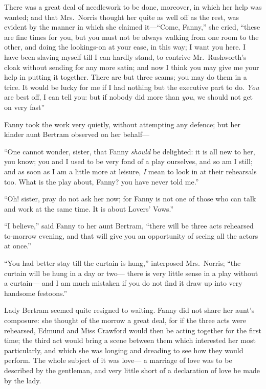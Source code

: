 There was a great deal of needlework to be done, moreover,
in which her help was wanted; and that Mrs.\ Norris
thought her quite as well off as the rest, was evident
by the manner in which she claimed it---``Come, Fanny,''
she cried, ``these are fine times for you, but you must
not be always walking from one room to the other,
and doing the lookings-on at your ease, in this way;
I want you here.  I have been slaving myself till I
can hardly stand, to contrive Mr.\ Rushworth's cloak
without sending for any more satin; and now I think
you may give me your help in putting it together.
There are but three seams; you may do them in a trice.
It would be lucky for me if I had nothing but the executive
part to do.  \emph{You} are best off, I can tell you:
but if nobody did more than \emph{you}, we should not get on
very fast''

Fanny took the work very quietly, without attempting
any defence; but her kinder aunt Bertram observed on her behalf---%

``One cannot wonder, sister, that Fanny \emph{should} be delighted:
it is all new to her, you know; you and I used to be
very fond of a play ourselves, and so am I still;
and as soon as I am a little more at leisure, \emph{I} mean
to look in at their rehearsals too.  What is the play about,
Fanny? you have never told me.''

``Oh! sister, pray do not ask her now; for Fanny is not
one of those who can talk and work at the same time.
It is about Lovers' Vows.''

``I believe,'' said Fanny to her aunt Bertram, ``there will
be three acts rehearsed to-morrow evening, and that will
give you an opportunity of seeing all the actors at once.''

``You had better stay till the curtain is hung,'' interposed
Mrs.\ Norris; ``the curtain will be hung in a day or two---%
there is very little sense in a play without a curtain---%
and I am much mistaken if you do not find it draw up
into very handsome festoons.''

Lady Bertram seemed quite resigned to waiting.  Fanny did
not share her aunt's composure:  she thought of the morrow
a great deal, for if the three acts were rehearsed,
Edmund and Miss Crawford would then be acting together
for the first time; the third act would bring a scene
between them which interested her most particularly,
and which she was longing and dreading to see how they
would perform.  The whole subject of it was love---%
a marriage of love was to be described by the gentleman,
and very little short of a declaration of love be made by
the lady.


